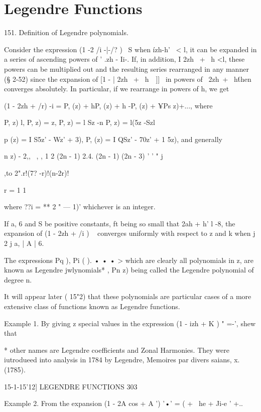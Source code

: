 \chapter{Legendre Functions} 

151. Definition of Legendre polynomials.

Consider the expression (1 -2 /i -|-/? )~ S when \'izh-h' \ < l, it
can be expanded in a series of ascending powers of ' .zh - Ii-. If, in
addition, I 2zh \ + \ h <l, these powers can be multiplied out and the
resulting series rearranged in any manner (§ 2-52) since the expansion
of [1 - | 2zh \ + \ h\ \ ]]~ in powers of \ 2zh\ + \ h\' then
converges absolutely. In particular, if we rearrange in powers of h,
we get

(1 - 2zh + /r) -i = P, (z) + hP, (z) + h -P, (z) + ¥Ps z)+..., where

P, z) l, P, z) = z, P, z) = l Sz -n P, z) = l(5z -Szl

p (z) = I S5z' - Wz' + 3), P, (z) = I QSz' - 70z' + 1 5z), and
generally

 n z) - 2,, \ , , 1 2 (2n - 1) 2.4. (2n - 1) (2n - 3) ' ' " j

,to 2".r!(7? -r)!(n-2r)!



r = 1 1



where ??i = ** 2 " — 1)' whichever is an integer.

If a, 6 and S be positive constants, ft being so small that 2ah + h' l
-8, the expansion of (1 - 2zh + /i ) ~ converges uniformly with
respect to z and k when j 2 j a, | A | 6.

The expressions Pq ), Pi ( ). • • • > which are clearly all
polynomials in z, are known as Legendre jwlynomials* , Pn z) being
called the Legendre polynomial of degree n.

It will appear later ( 15"2) that these polynomials are particular
cases of a more extensive class of functions known as Legendre
functions.

Example 1. By giving z special values in the expression (1 - izh + K )
" =-', shew that

* other names are Legendre coefficients and Zonal Harmonies. They were
iutrodueed into analysis in 1784 by Legendre, Memoires par divers
saians, x. (1785).



15-1-15'12] LEGENDRE FUNCTIONS 303

Example 2. From the expansion (1 - 2A cos + A ') '•' = ( + \ he + Ji-e
' +..\



